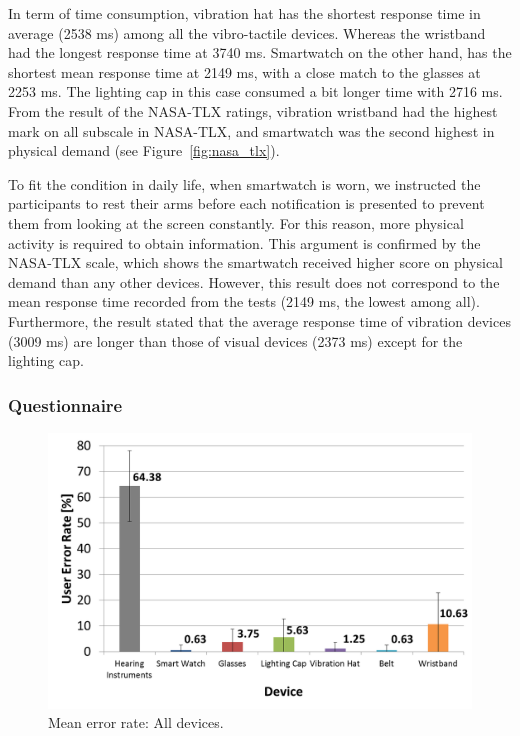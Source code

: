 \documentclass{sigchi}
\begin{document}
In term of time consumption, vibration hat has the shortest response time in average (2538 ms) among all the vibro-tactile devices. Whereas the wristband had the longest response time at 3740 ms. Smartwatch on the other hand, has the shortest mean response time at 2149 ms, with a close match to the glasses at 2253 ms. The lighting cap in this case consumed a bit longer time with 2716 ms. From the result of the NASA-TLX ratings, vibration wristband had the highest mark on all subscale in NASA-TLX, and smartwatch was the second highest in physical demand (see Figure~\ref{fig:nasa_tlx}). 

To fit the condition in daily life, when smartwatch is worn, we instructed the participants to rest their arms before each notification is presented to prevent them from looking at the screen constantly. For this reason, more physical activity is required to obtain information. This argument is confirmed by the NASA-TLX scale, which shows the smartwatch received higher score on physical demand than any other devices. However, this result does not correspond to the mean response time recorded from the tests (2149 ms, the lowest among all). Furthermore, the result stated that the average response time of vibration devices (3009 ms) are longer than those of visual devices (2373 ms) except for the lighting cap.

\subsubsection{Questionnaire}


\begin{figure}[!t]
\centering
\includegraphics[width=\columnwidth]{All_ER}
\caption{Mean error rate: All devices.}
\label{fig:All_ER}
\end{figure}
\end{document}

